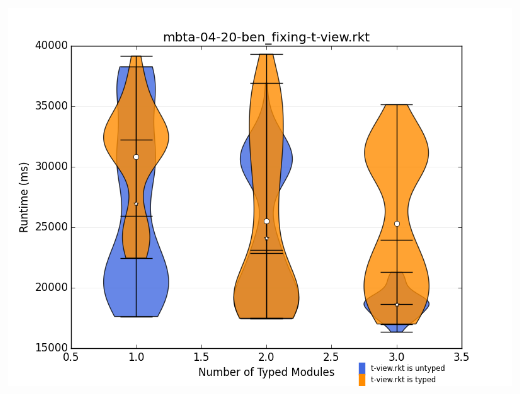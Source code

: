 \documentclass{article}
\begin{document}
\includegraphics[width=\textwidth]{mbta-04-20-ben_fixing-t-view.rkt-dv.png}
\end{document}

